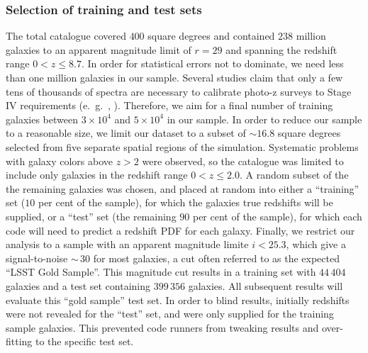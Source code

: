 \subsubsection{Selection of training and test sets}
\label{sec:buzztraining}
The total catalogue covered $400$ square degrees and contained $238$ million galaxies to an apparent magnitude limit of $r\!=\!29$ and spanning the redshift range $0\!<\!z\!\leq\!8.7$.  In order for statistical errors not to dominate, we need less than one million galaxies in our sample.  Several studies claim that only a few tens of thousands of spectra are necessary to calibrate photo-z surveys to Stage IV requirements (e.~g.~\citet{Bernstein:10}, \citet{Masters:2017}).  Therefore, we aim for a final number of training galaxies between $3\times 10^{4}$ and $5\times 10^{4}$ in our sample.
In order to reduce our sample to a reasonable size, we limit our dataset to a subset of $\sim\!16.8$ square degrees selected from five separate spatial regions of the simulation. Systematic problems with galaxy colors above $z\!>\!2$ were observed, so the catalogue was limited to include only galaxies in the redshift range $0\!<\!z\!\leq\!2.0$. A random subset of the the remaining galaxies was chosen, and placed at random into either a ``training'' set ($10$ per cent of the sample), for which the galaxies true redshifts will be supplied, or a ``test'' set (the remaining $90$ per cent of the sample), for which each code will need to predict a redshift PDF for each galaxy.  
Finally, we restrict our analysis to a sample with an apparent magnitude limite $i<25.3$, which give a signal-to-noise $\sim\,30$ for most galaxies, a cut often referred to as the expected ``LSST Gold Sample''.  This magnitude cut results in a training set with $44\,404$ galaxies and a test set containing $399\,356$ galaxies.  All subsequent results will evaluate this ``gold sample'' test set.  In order to blind results, initially redshifts were not revealed for the ``test'' set, and were only supplied for the training sample galaxies.  This prevented code runners from tweaking results and over-fitting to the specific test set.


